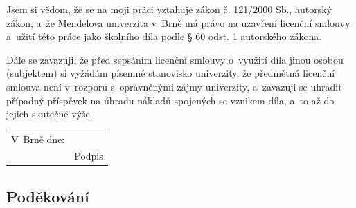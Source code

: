 \documentclass[12pt,a4paper,oneside]{article}
\begin{document}
Jsem si vědom{\the\MuzZena}, že se na moji práci vztahuje zákon č. 121/2000 Sb., autorský zákon, a~že Mendelova univerzita v~Brně má právo na uzavření licenční smlouvy a~užití této práce jako školního díla podle § 60 odst. 1 autorského zákona. 

Dále se zavazuji, že před sepsáním licenční smlouvy o~využití díla jinou osobou (subjektem) si vyžádám písemné stanovisko univerzity, že předmětná licenční smlouva není v~rozporu s~oprávněnými zájmy univerzity, a~zavazuji se uhradit případný příspěvek na úhradu nákladů spojených se vznikem díla, a~to až do jejich skutečné výše. 

\vfill



\begin{tabular}{@{}p{2.5in}p{2.5in}@{}}
  V~Brně dne: \dotfill 	& \dotfill \\
   						& \multicolumn{1}{c}{Podpis} \\
\end{tabular}

\newpage
\phantom{a}

\vfill


























\subsection*{Poděkování}
{\the\Podekovani}

















\end{document}
